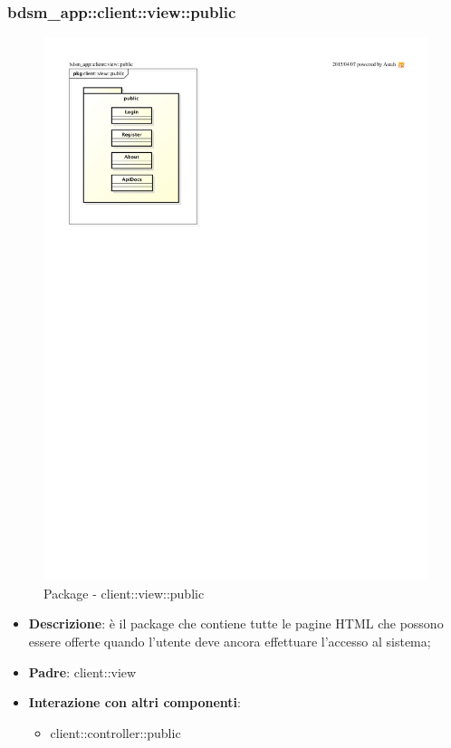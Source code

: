 \subsubsection{bdsm\_app::client::view::public} %
\label{ssub:bdsm_app_client_view_public}
\begin{figure}[htbp]
	\centering
	\centerline{\includegraphics[scale=1.05]{./images/client_view_public.pdf}}
	\caption{Package - client::view::public}
\end{figure}

\begin{itemize}
	\item \textbf{Descrizione}: è il package che contiene tutte le pagine HTML che possono essere offerte quando l'utente deve ancora effettuare l'accesso al sistema;
	\item \textbf{Padre}: client::view
	\item \textbf{Interazione con altri componenti}: 
		\begin{itemize}
			\item client::controller::public
		\end{itemize}
\end{itemize}

